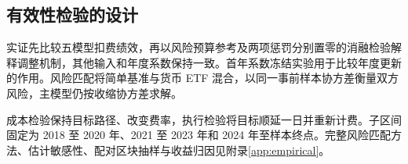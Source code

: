 \subsection{有效性检验的设计}
\label{sec:diagnostic_design}
实证先比较五模型扣费绩效，再以风险预算参考及两项惩罚分别置零的消融检验解释调整机制，其他输入和年度系数保持一致。首年系数冻结实验用于比较年度更新的作用。风险匹配将简单基准与货币 ETF 混合，以同一事前样本协方差衡量双方风险，主模型仍按收缩协方差求解。

成本检验保持目标路径、改变费率，执行检验将目标顺延一日并重新计费。子区间固定为 2018 至 2020 年、2021 至 2023 年和 2024 年至样本终点。完整风险匹配方法、估计敏感性、配对区块抽样与收益归因见附录\ref{app:empirical}。

